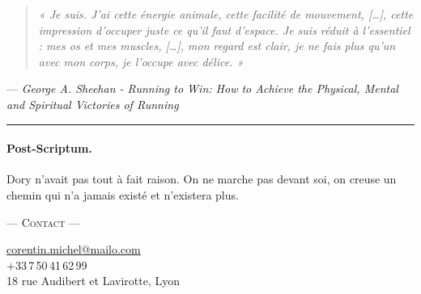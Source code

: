 \documentclass[10pt, a4paper, twocolumn]{article}
\begin{document}
\begin{quote}
\itshape
« Je suis. J'ai cette énergie animale, cette facilité de mouvement, […], cette impression d'occuper juste ce qu'il faut d'espace. Je suis réduit à l'essentiel : mes os et mes muscles, […], mon regard est clair, je ne fais plus qu'un avec mon corps, je l'occupe avec délice. »
\end{quote}
\hfill \small — \textit{George A. Sheehan - Running to Win: How to Achieve the Physical, Mental and Spiritual Victories of Running}

\vspace{0.5cm}
\noindent\rule{0.4\linewidth}{0.5pt} %
\vspace{0.3cm}

\paragraph{Post-Scriptum.} Dory n'avait pas tout à fait raison. On ne marche pas devant soi, on creuse un chemin qui n'a jamais existé et n'existera plus.

\vspace*{1.5cm}
\begin{center}
\small
\textsc{— Contact —}\par\vspace{0.3em}
\href{mailto:corentin.michel@mailo.com}{corentin.michel@mailo.com}\\
+33\,7\,50\,41\,62\,99\\
18 rue Audibert et Lavirotte, Lyon
\end{center}
\end{document}
